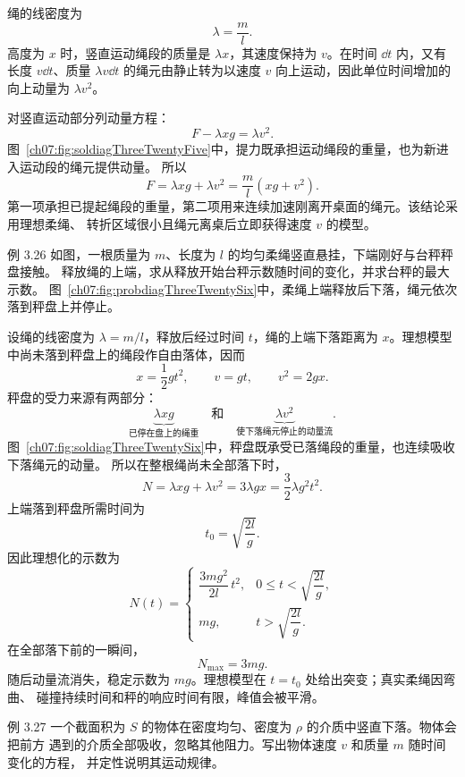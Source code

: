 \begin{xesolution}
绳的线密度为
\[
 \lambda=\frac{m}{l}.
\]
高度为 $x$ 时，竖直运动绳段的质量是 $\lambda x$，其速度保持为 $v$。在时间
$\dd t$ 内，又有长度 $v\dd t$、质量 $\lambda v\dd t$ 的绳元由静止转为以速度 $v$
向上运动，因此单位时间增加的向上动量为 $\lambda v^2$。

对竖直运动部分列动量方程：
\[
 F-\lambda xg=\lambda v^2.
\]
图~\ref{ch07:fig:soldiagThreeTwentyFive}中，提力既承担运动绳段的重量，也为新进入运动段的绳元提供动量。
\soldiagThreeTwentyFive
所以
\[
 \boxed{F=\lambda xg+\lambda v^2
 =\frac{m}{l}\left(xg+v^2\right)}.
\]
第一项承担已提起绳段的重量，第二项用来连续加速刚离开桌面的绳元。该结论采用理想柔绳、
转折区域很小且绳元离桌后立即获得速度 $v$ 的模型。
\end{xesolution}

\Needspace{0.38\textheight}
\begin{origexamplebox}{例 3.26}
如图，一根质量为 $m$、长度为 $l$ 的均匀柔绳竖直悬挂，下端刚好与台秤秤盘接触。
释放绳的上端，求从释放开始台秤示数随时间的变化，并求台秤的最大示数。
图~\ref{ch07:fig:probdiagThreeTwentySix}中，柔绳上端释放后下落，绳元依次落到秤盘上并停止。
\probdiagThreeTwentySix
\end{origexamplebox}

\begin{xesolution}
设绳的线密度为 $\lambda=m/l$，释放后经过时间 $t$，绳的上端下落距离为 $x$。理想模型
中尚未落到秤盘上的绳段作自由落体，因而
\[
 x=\frac12gt^2,\qquad v=gt,\qquad v^2=2gx.
\]
秤盘的受力来源有两部分：
\[
 \underbrace{\lambda xg}_{\text{已停在盘上的绳重}}
 \quad\text{和}\quad
 \underbrace{\lambda v^2}_{\text{使下落绳元停止的动量流}}.
\]
图~\ref{ch07:fig:soldiagThreeTwentySix}中，秤盘既承受已落绳段的重量，也连续吸收下落绳元的动量。
\soldiagThreeTwentySix
所以在整根绳尚未全部落下时，
\[
 N=\lambda xg+\lambda v^2
 =3\lambda gx
 =\frac32\lambda g^2t^2.
\]
上端落到秤盘所需时间为
\[
 t_0=\sqrt{\frac{2l}{g}}.
\]
因此理想化的示数为
\[
 \boxed{
 N(t)=
 \begin{cases}
 \dfrac{3m g^2}{2l}\,t^2,
   &0\le t<\sqrt{\dfrac{2l}{g}},\\[6pt]
 mg,&t>\sqrt{\dfrac{2l}{g}}.
 \end{cases}}
\]
在全部落下前的一瞬间，
\[
 \boxed{N_{\max}=3mg}.
\]
随后动量流消失，稳定示数为 $mg$。理想模型在 $t=t_0$ 处给出突变；真实柔绳因弯曲、
碰撞持续时间和秤的响应时间有限，峰值会被平滑。
\end{xesolution}

\begin{origexamplebox}{例 3.27}
一个截面积为 $S$ 的物体在密度均匀、密度为 $\rho$ 的介质中竖直下落。物体会把前方
遇到的介质全部吸收，忽略其他阻力。写出物体速度 $v$ 和质量 $m$ 随时间变化的方程，
并定性说明其运动规律。
\end{origexamplebox}

